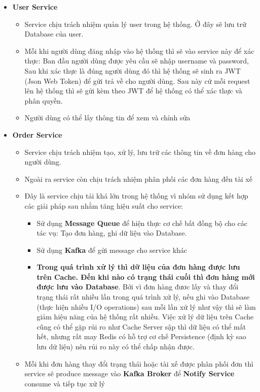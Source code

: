 		
		\begin{itemize}
			\item \textbf{User Service}
			\begin{itemize}
				\item Service chịu trách nhiệm quản lý user trong hệ thống. Ở đây sẽ lưu trữ Database của user.
				\item Mỗi khi người dùng đăng nhập vào hệ thống thì sẽ vào service này để xác thực: Ban đầu người dùng được yêu cầu sẽ nhập username và password, Sau khi xác thực là đúng người dùng đó thì hệ thống sẽ sinh ra JWT (Json Web Token) để gửi trả về cho người dùng. Sau này cứ mỗi request lên hệ thống thì sẽ gửi kèm theo JWT để hệ thống có thể xác thực và phân quyền.
				\item Người dùng có thể lấy thông tin để xem và chỉnh sửa
			\end{itemize}
			\item \textbf{Order Service}
			\begin{itemize}
				\item Service chịu trách nhiệm tạo, xử lý, lưu trữ các thông tin về đơn hàng cho người dùng.
				\item Ngoài ra service còn chịu trách nhiệm phân phối các đơn hàng đến tài xế
				\item Đây là service chịu tải khá lớn trong hệ thống vì nhóm sử dụng kết hợp các giải pháp sau nhằm tăng hiệu suất cho service: 
					\begin{itemize}
						\item Sử dụng \textbf{Message Queue} để hiện thực cơ chế bất đồng bộ cho các tác vụ: Tạo đơn hàng, ghi dữ liệu vào Database.
						\item Sử dụng \textbf{Kafka} để gửi message cho service khác
						\item \textbf{Trong quá trình xử lý thì dữ liệu của đơn hàng được lưu trên Cache. Đến khi nào có trạng thái cuối thì đơn hàng mới được lưu vào Database}. Bởi vì đơn hàng đươc lấy và thay đổi trạng thái rất nhiều lần trong quá trình xử lý, nếu ghi vào Database (thực hiện nhiều I/O operations) sau mỗi lần xử lý như vậy thì sẽ làm giảm hiệu năng của hệ thống rất nhiều. Việc xử lý dữ liệu trên Cache cũng có thể gặp rủi ro như Cache Server sập thì dữ liệu có thể mất hết, nhưng rất may Redis có hỗ trợ cơ chế Persistence (định kỳ sao lưu dữ liệu) nên rủi ro này có thể chấp nhận được.
					\end{itemize}
				\item Mỗi khi đơn hàng thay đổi trạng thái hoặc tài xế được phân phối đơn thì service sẽ produce message vào \textbf{Kafka Broker} để \textbf{Notify Service} consume và tiếp tục xử lý

\end{itemize}
\end{itemize}
